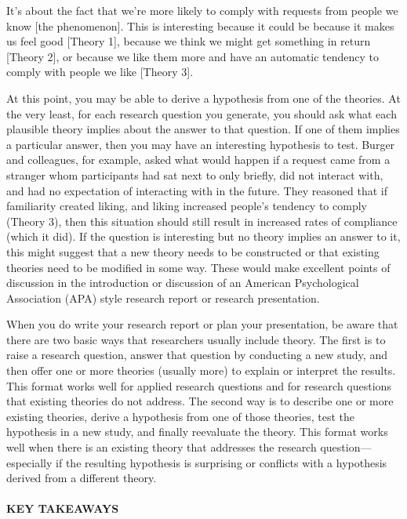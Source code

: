 \documentclass[
]{krantz}
\begin{document}
It's about the fact that we're more likely to comply with requests from people we know {[}the phenomenon{]}. This is interesting because it could be because it makes us feel good {[}Theory 1{]}, because we think we might get something in return {[}Theory 2{]}, or because we like them more and have an automatic tendency to comply with people we like {[}Theory 3{]}.

At this point, you may be able to derive a hypothesis from one of the theories. At the very least, for each research question you generate, you should ask what each plausible theory implies about the answer to that question. If one of them implies a particular answer, then you may have an interesting hypothesis to test. Burger and colleagues, for example, asked what would happen if a request came from a stranger whom participants had sat next to only briefly, did not interact with, and had no expectation of interacting with in the future. They reasoned that if familiarity created liking, and liking increased people's tendency to comply (Theory 3), then this situation should still result in increased rates of compliance (which it did). If the question is interesting but no theory implies an answer to it, this might suggest that a new theory needs to be constructed or that existing theories need to be modified in some way. These would make excellent points of discussion in the introduction or discussion of an American Psychological Association (APA) style research report or research presentation.

When you do write your research report or plan your presentation, be aware that there are two basic ways that researchers usually include theory. The first is to raise a research question, answer that question by conducting a new study, and then offer one or more theories (usually more) to explain or interpret the results. This format works well for applied research questions and for research questions that existing theories do not address. The second way is to describe one or more existing theories, derive a hypothesis from one of those theories, test the hypothesis in a new study, and finally reevaluate the theory. This format works well when there is an existing theory that addresses the research question---especially if the resulting hypothesis is surprising or conflicts with a hypothesis derived from a different theory.

\paragraph*{KEY TAKEAWAYS}\label{key-takeaways-28}
\end{document}
